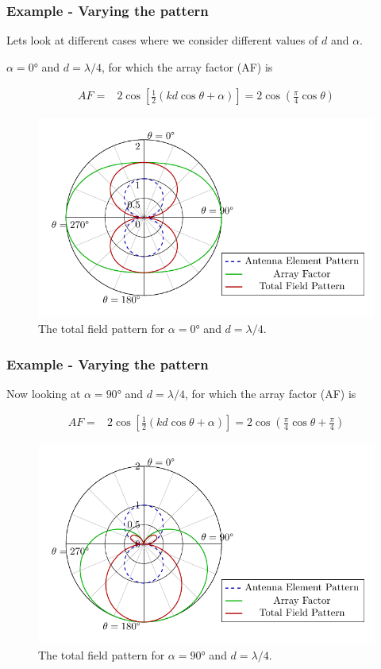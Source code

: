 \documentclass[10pt]{beamer}
\begin{document}
\begin{frame}
    \frametitle{Example - Varying the pattern}

    Lets look at different cases where we consider different values of $d$ and $\alpha$.
    \begin{outline}
        \1 $\alpha = \ang{0}$ and $d = \lambda/4$, for which the array factor (AF) is
    \end{outline}
    \small
    \begin{align*}
        AF {}=& 2 \cos \left[ \frac{1}{2} \left( k d \cos \theta + \alpha  \right) \right] = 2 \cos \left(\frac{\pi}{4}\cos \theta \right)
    \end{align*}
    \normalsize
\begin{figure}[T!]
    \centering
    \includegraphics[width=.55\textwidth]{total_pattern_d_quarter_alpha_0.pdf}
    \caption{The total field pattern for $\alpha = \ang{0}$ and $d = \lambda/4$.}
    \label{fig:antenna_array}
\end{figure} 
\end{frame}   

\begin{frame}
    \frametitle{Example - Varying the pattern}

    \begin{outline}
        \1 Now looking at $\alpha = \ang{90}$ and $d = \lambda/4$, for which the array factor (AF) is
    \end{outline}
    \small
    \begin{align*}
        AF {}=& 2 \cos \left[ \frac{1}{2} \left( k d \cos \theta + \alpha  \right) \right] = 2 \cos \left(\frac{\pi}{4}\cos \theta + \frac{\pi}{4}\right)
    \end{align*}
    \normalsize
\begin{figure}[T!]
    \centering
    \includegraphics[width=.55\textwidth]{total_pattern_d_quarter_alpha_90.pdf}
    \caption{The total field pattern for $\alpha = \ang{90}$ and $d = \lambda/4$.}
    \label{fig:antenna_array}
\end{figure}  

\end{frame}
\end{document}
